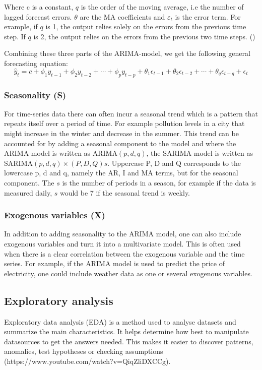 Where c is a constant, $q$ is the order of the moving average, i.e the number of lagged forecast errors. $\theta$ are the MA coefficients and $\varepsilon_{t}$ is the error term. For example, if $q$ is 1, the output relies solely on the errors from the previous time step. If $q$ is 2, the output relies on the errors from the previous two time steps. (\cite{hyndman_athanasopoulos_2021}) 

Combining these three parts of the ARIMA-model, we get the following general forecasting equation:
\begin{equation}
\hat{y}_t = c + \phi_1y_{t-1} + \phi_2y_{t-2} + \cdots + \phi_py_{t-p} + \theta_1\epsilon_{t-1} + \theta_2\epsilon_{t-2} + \cdots + \theta_q\epsilon_{t-q} + \epsilon_t
\end{equation}

\subsubsection{Seasonality (S)}\label{SeasonalityTheory}
For time-series data there can often incur a seasonal trend which is a pattern that repeats itself over a period of time. For example pollution levels in a city that might increase in the winter and decrease in the summer. This trend can be accounted for by adding a seasonal component to the model and where the ARIMA-model is written as ARIMA$(p,d,q)$, the SARIMA-model is written as SARIMA$(p,d,q) \times (P,D,Q)s$. Uppercase P, D and Q corresponds to the lowercase p, d and q, namely the AR, I and MA terms, but for the seasonal component. The $s$ is the number of periods in a season, for example if the data is measured daily, $s$ would be 7 if the seasonal trend is weekly.~\parencite{chang_et_al_2012}

\subsubsection{Exogenous variables (X)}\label{ExogenousTheory}
In addition to adding seasonality to the ARIMA model, one can also include exogenous variables and turn it into a multivariate model. This is often used when there is a clear correlation between the exogenous variable and the time series. For example, if the ARIMA model is used to predict the price of electricity, one could include weather data as one or several exogenous variables.~\parencite{elamin_fukushige_2018}


\subsection{Exploratory analysis}
Exploratory data analysis (EDA) is a method used to analyse datasets and summarize the main characteristics. It helps determine how best to manipulate datasources to get the answers needed. This makes it easier to discover patterns, anomalies, test hypotheses or checking assumptions (https://www.youtube.com/watch?v=QiqZliDXCCg). 

